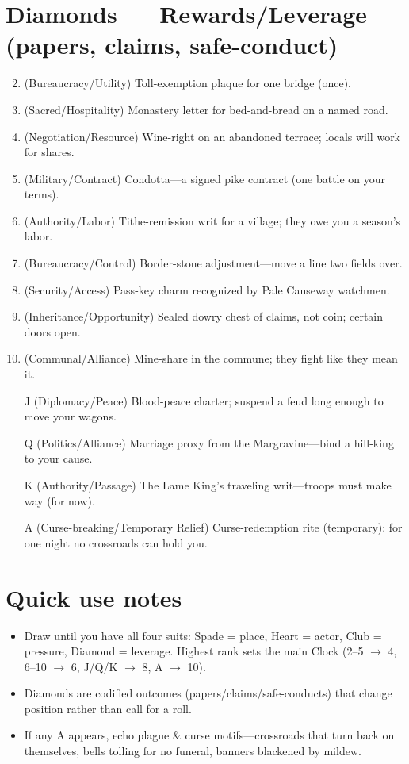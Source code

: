 \section*{Diamonds --- Rewards/Leverage (papers, claims, safe-conduct)}
\label{sec:acasia-rewards}
\begin{enumerate}
\setcounter{enumi}{1}
\item (Bureaucracy/Utility) Toll-exemption plaque for one bridge (once).
\item (Sacred/Hospitality) Monastery letter for bed-and-bread on a named road.
\item (Negotiation/Resource) Wine-right on an abandoned terrace; locals will work for shares.
\item (Military/Contract) Condotta---a signed pike contract (one battle on your terms).
\item (Authority/Labor) Tithe-remission writ for a village; they owe you a season's labor.
\item (Bureaucracy/Control) Border-stone adjustment---move a line two fields over.
\item (Security/Access) Pass-key charm recognized by Pale Causeway watchmen.
\item (Inheritance/Opportunity) Sealed dowry chest of claims, not coin; certain doors open.
\item (Communal/Alliance) Mine-share in the commune; they fight like they mean it.
\item[J] (Diplomacy/Peace) Blood-peace charter; suspend a feud long enough to move your wagons.
\item[Q] (Politics/Alliance) Marriage proxy from the Margravine---bind a hill-king to your cause.
\item[K] (Authority/Passage) The Lame King's traveling writ---troops must make way (for now).
\item[A] (Curse-breaking/Temporary Relief) Curse-redemption rite (temporary): for one night no crossroads can hold you.
\end{enumerate}

\section*{Quick use notes}
\label{sec:acasia-quick-use}
\begin{itemize}
\item Draw until you have all four suits: Spade = place, Heart = actor, Club = pressure, Diamond = leverage. Highest rank sets the main Clock (2--5 $\rightarrow$ 4, 6--10 $\rightarrow$ 6, J/Q/K $\rightarrow$ 8, A $\rightarrow$ 10).
\item Diamonds are codified outcomes (papers/claims/safe-conducts) that change position rather than call for a roll.
\item If any A appears, echo plague \& curse motifs---crossroads that turn back on themselves, bells tolling for no funeral, banners blackened by mildew.
\end{itemize}

